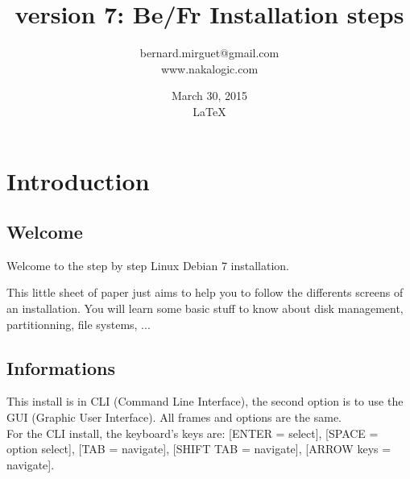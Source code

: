 \documentclass[a4paper,12pt]{book}
\begin{document}



\title{version 7: Be/Fr Installation steps}
\author{bernard.mirguet@gmail.com \\www.nakalogic.com}
\date{March 30, 2015\\\LaTeX} 
\maketitle

\tableofcontents


\chapter[Intro]{Introduction}
\section{Welcome}
Welcome to the step by step Linux Debian 7 installation.

This little sheet of paper just aims to help you to follow the differents screens of an installation. You will learn some basic stuff to know about disk management, partitionning, file systems, ...



\section{Informations}
This install is in CLI (Command Line Interface), the second option is to use the GUI (Graphic User Interface). All frames and options are the same. 
\\For the CLI install, the keyboard's keys are: [ENTER = select], [SPACE = option select], [TAB = navigate], [SHIFT TAB = navigate], [ARROW keys = navigate].
\end{document}
